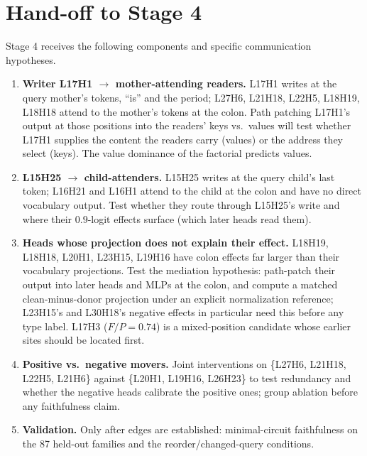 \documentclass[11pt,a4paper]{article}
\begin{document}
\section{Hand-off to Stage 4}
\label{sec:stage4}
Stage 4 receives the following components and specific communication hypotheses.

\begin{enumerate}
\item \textbf{Writer L17H1 $\rightarrow$ mother-attending readers.} L17H1 writes at
the query mother's tokens, ``is'' and the period; L27H6, L21H18, L22H5, L18H19,
L18H18 attend to the mother's tokens at the colon. Path patching L17H1's output at
those positions into the readers' keys vs.\ values will test whether L17H1 supplies the
content the readers carry (values) or the address they select (keys). The value
dominance of the factorial predicts values.
\item \textbf{L15H25 $\rightarrow$ child-attenders.} L15H25 writes at the query child's
last token; L16H21 and L16H1 attend to the child at the colon and have no direct
vocabulary output. Test whether they route through L15H25's write and where their
$0.9$-logit effects surface (which later heads read them).
\item \textbf{Heads whose projection does not explain their effect.} L18H19, L18H18,
L20H1, L23H15, L19H16 have colon effects far larger than their vocabulary projections.
Test the mediation hypothesis: path-patch their output into later heads and MLPs at the
colon, and compute a matched clean-minus-donor projection under an explicit
normalization reference; L23H15's and L30H18's negative effects in particular need this
before any type label. L17H3 ($F/P=0.74$) is a mixed-position candidate whose earlier
sites should be located first.
\item \textbf{Positive vs.\ negative movers.} Joint interventions on \{L27H6, L21H18,
L22H5, L21H6\} against \{L20H1, L19H16, L26H23\} to test redundancy and whether the
negative heads calibrate the positive ones; group ablation before any faithfulness
claim.
\item \textbf{Validation.} Only after edges are established: minimal-circuit
faithfulness on the 87 held-out families and the reorder/changed-query conditions.
\end{enumerate}
\end{document}
